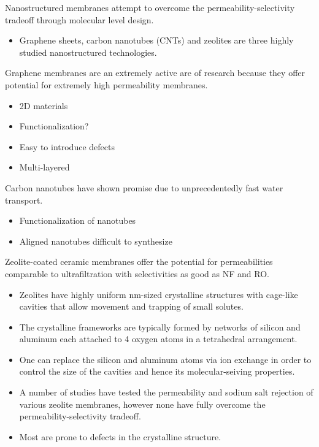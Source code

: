 \documentclass{article}
\begin{document}
  Nanostructured membranes attempt to overcome the permeability-selectivity 
  tradeoff through molecular level design.
  \begin{itemize}
	\item Graphene sheets, carbon nanotubes (CNTs) and zeolites are three
	highly studied nanostructured technologies.
  \end{itemize}
  
  Graphene membranes are an extremely active are of research because 
  they offer potential for extremely high permeability membranes.
  \begin{itemize}
    \item 2D materials
    \item Functionalization?
    \item Easy to introduce defects
    \item Multi-layered
  \end{itemize}
  
  Carbon nanotubes have shown promise due to unprecedentedly fast
  water transport. 
  \begin{itemize}
    \item Functionalization of nanotubes
    \item Aligned nanotubes difficult to synthesize
  \end{itemize}
   
  Zeolite-coated ceramic membranes offer the potential for permeabilities
  comparable to ultrafiltration with selectivities as good as NF and RO. 
  \begin{itemize}
    \item Zeolites have highly uniform nm-sized crystalline structures with
    cage-like cavities that allow movement and trapping of small solutes. \cite{pendergast_review_2011}
    \item The crystalline frameworks are typically formed by networks of silicon
    and aluminum each attached to 4 oxygen atoms in a tetrahedral arrangement. 
    \item One can replace the silicon and aluminum atoms via ion exchange 
    in order to control the size of the cavities and hence its molecular-seiving properties.
    \item A number of studies have tested the permeability and sodium salt
    rejection of various zeolite membranes, however none have fully
    overcome the permeability-selectivity tradeoff.
    \item Most are prone to defects in the crystalline structure.
  \end{itemize}
\end{document}
